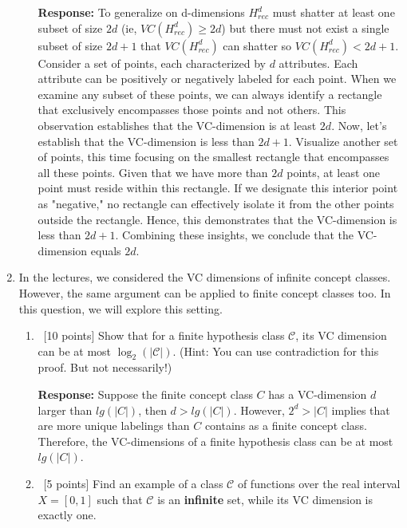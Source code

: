 \begin{enumerate}
\begin{enumerate}
	\textbf{Response:} To generalize on d-dimensions $H^d_{rec}$ must shatter at least one subset of size $2d$ (ie, $VC(H^d_{rec}) \geq 2d$) but there must not exist a single subset of size $2d+1$ that $VC(H^d_{rec})$ can shatter so $VC(H^d_{rec}) < 2d+1$.
	\newline
	Consider a set of points, each characterized by $d$ attributes. Each attribute can be positively or negatively labeled for each point. When we examine any subset of these points, we can always identify a rectangle that exclusively encompasses those points and not others. This observation establishes that the VC-dimension is at least $2d$. Now, let’s establish that the VC-dimension is less than $2d+1$. Visualize another set of points, this time focusing on the smallest rectangle that encompasses all these points. Given that we have more than $2d$ points, at least one point must reside within this rectangle. If we designate this interior point as "negative," no rectangle can effectively isolate it from the other points outside the rectangle. Hence, this demonstrates that the VC-dimension is less than $2d+1$. Combining these insights, we conclude that the VC-dimension equals $2d$.
  \end{enumerate}
  
\item In the lectures, we considered the VC dimensions of infinite
  concept classes. However, the same argument can be applied to finite
  concept classes too. In this question, we will explore this setting.

  \begin{enumerate}
  \item ~[10 points] Show that for a finite hypothesis class
    $\mathcal{C}$, its VC dimension can be at most
    $\log_2\left(|\mathcal{C}|\right)$. (Hint: You can use
    contradiction for this proof. But not necessarily!)
    
    \textbf{Response:} Suppose the finite concept class $C$ has a VC-dimension $d$ larger than $lg(|C|)$, then $d > lg(|C|)$. However, $2^d > |C|$ implies that are more unique labelings than $C$ contains as a finite concept class. Therefore, the VC-dimensions of a finite hypothesis class can be at most $lg(|C|)$.  

  \item ~[5 points] Find an example of a class $\mathcal{C}$ of
    functions over the real interval $X = [0,1]$ such that
    $\mathcal{C}$ is an {\bf infinite} set, while its VC dimension is
    exactly one.
    

\end{enumerate}
\end{enumerate}
